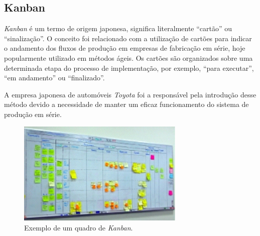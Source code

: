 \subsection{Kanban}
\par \emph{Kanban} é um termo de origem japonesa, significa literalmente ``cartão'' ou ``sinalização''. O conceito foi relacionado com a utilização de cartões para indicar o andamento dos fluxos de produção em empresas de fabricação em série, hoje popularmente utilizado em métodos ágeis. Os cartões são organizados sobre uma determinada etapa do processo de implementação, por exemplo, ``para executar'', ``em andamento'' ou ``finalizado''.
\par A empresa japonesa de automóveis \emph{Toyota} foi a responsável pela introdução desse método devido a necessidade de manter um eficaz funcionamento do sistema de produção em série.
\begin{figure}[!htb]
\centering
\includegraphics[width=8cm]{figuras/kanban_exemplo}
\caption{\label{fig:kanban_exemplo}Exemplo de um quadro de \emph{Kanban}.}
\end{figure}
